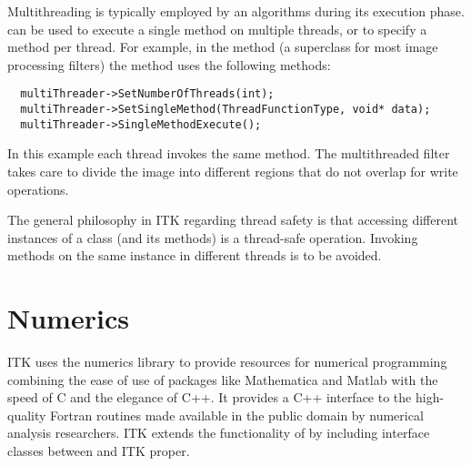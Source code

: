 Multithreading is typically employed by an algorithms during its execution
phase.  can be used to execute a single method on
multiple threads, or to specify a method per thread. For example, in the 
method  (a superclass for most image processing filters)
the  method uses the following methods:

\small
\begin{verbatim}
  multiThreader->SetNumberOfThreads(int);
  multiThreader->SetSingleMethod(ThreadFunctionType, void* data);
  multiThreader->SingleMethodExecute();
\end{verbatim}
\normalsize

In this example each thread invokes the same method. The multithreaded filter
takes care to divide the image into different regions that do not overlap for
write operations.

The general philosophy in ITK regarding thread safety is that accessing
different instances of a class (and its methods) is a thread-safe operation.
Invoking methods on the same instance in different threads is to be avoided.


\section{Numerics}
\label{sec:Numerics}


ITK uses the  numerics library to provide resources for numerical
programming combining the ease of use of packages like Mathematica and Matlab
with the speed of C and the elegance of C++. It provides a C++ interface to
the high-quality Fortran routines made available in the public domain by
numerical analysis researchers. ITK extends the functionality of 
by including interface classes between  and ITK proper.

